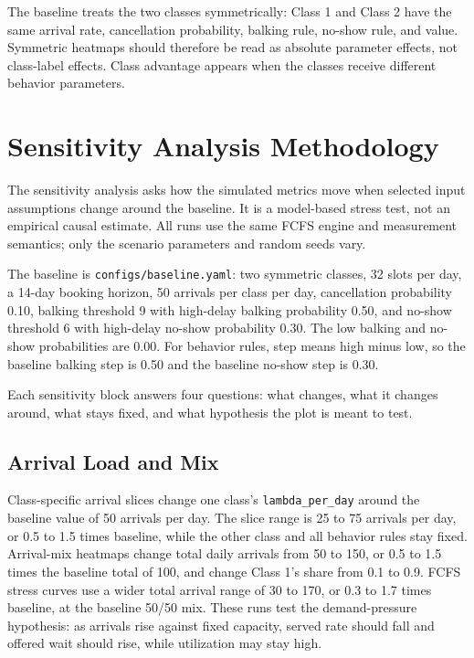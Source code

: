 \documentclass[11pt]{article}
\begin{document}
The baseline treats the two classes symmetrically: Class 1 and Class 2 have the same arrival rate, cancellation probability, balking rule, no-show rule, and value. Symmetric heatmaps should therefore be read as absolute parameter effects, not class-label effects. Class advantage appears when the classes receive different behavior parameters.

\section{Sensitivity Analysis Methodology}

The sensitivity analysis asks how the simulated metrics move when selected input
assumptions change around the baseline. It is a model-based stress test, not an
empirical causal estimate. All runs use the same FCFS engine and measurement
semantics; only the scenario parameters and random seeds vary.

The baseline is \texttt{configs/baseline.yaml}: two symmetric classes, 32 slots
per day, a 14-day booking horizon, 50 arrivals per class per day, cancellation
probability 0.10, balking threshold 9 with high-delay balking probability 0.50,
and no-show threshold 6 with high-delay no-show probability 0.30. The low
balking and no-show probabilities are 0.00. For behavior rules, step means
high minus low, so the baseline balking step is 0.50 and the baseline no-show
step is 0.30.

Each sensitivity block answers four questions: what changes, what it changes
around, what stays fixed, and what hypothesis the plot is meant to test.

\subsection{Arrival Load and Mix}
Class-specific arrival slices change one class's \texttt{lambda\_per\_day}
around the baseline value of 50 arrivals per day. The slice range is 25 to 75
arrivals per day, or 0.5 to 1.5 times baseline, while the other class and all
behavior rules stay fixed. Arrival-mix heatmaps change total daily arrivals from
50 to 150, or 0.5 to 1.5 times the baseline total of 100, and change Class 1's
share from 0.1 to 0.9. FCFS stress curves use a wider total arrival range of 30
to 170, or 0.3 to 1.7 times baseline, at the baseline 50/50 mix. These runs test
the demand-pressure hypothesis: as arrivals rise against fixed capacity, served
rate should fall and offered wait should rise, while utilization may stay high.
\end{document}
